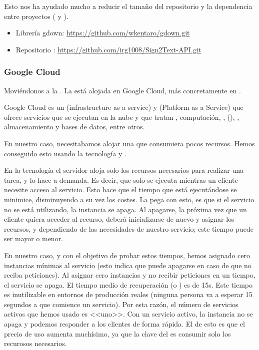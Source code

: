 Esto nos ha ayudado mucho a reducir el tamaño del repositorio y la dependencia entre proyectos ( y ).

\begin{itemize}
  \item Librería gdown: \url{https://github.com/wkentaro/gdown.git}
  \item Repositorio : \url{https://github.com/irg1008/Sign2Text-API.git}
\end{itemize}

\subsubsection{Google Cloud}

Moviéndonos a la . La  está alojada en Google Cloud, más concretamente en .

Google Cloud es un  (infrastructure as a service) y  (Platform as a Service) que ofrece servicios que se ejecutan en la nube y que tratan , computación, ,  (), , almacenamiento y bases de datos, entre otros.

En nuestro caso, necesitabamos alojar una  que consumiera pocos recursos. Hemos conseguido esto usando la tecnología  y .

En la tecnología  el servidor aloja solo los recursos necesarios para realizar una tarea, y lo hace a demanda. Es decir, que solo se ejecuta mientras un cliente necesite acceso al servicio. Esto hace que el tiempo que está ejecutándose se minimice, disminuyendo a su vez los costes. La pega con esto, es que si el servicio no se está utilizando, la instancia se apaga. Al apagarse, la próxima vez que un cliente quiera acceder al recurso, deberá inicializarse de nuevo y asignar los recursos, y dependiendo de las neecsidades de nuestro servicio; este tiempo puede ser mayor o menor.

En nuestro caso, y con el objetivo de probar estos tiempos, hemos asignado cero instancias mínimas al servicio (esto indica que puede apagarse en caso de que no reciba peticiones). Al asignar cero instancias y no recibir peticiones en un tiempo, el servicio se apaga. El tiempo medio de recuperación (o ) es de 15s. Este tiempo es inutilizable en entornos de producción reales (ninguna persona va a esperar 15 segundos a que comience un servicio). Por esta razón, el número de servicios activos que hemos usado es <<uno>>. Con un servicio activo, la instancia no se apaga y podemos responder a los clientes de forma rápida. El  de esto es que el precio de uso aumenta muchísimo, ya que la clave del  es consumir solo los recurosos necesarios.

